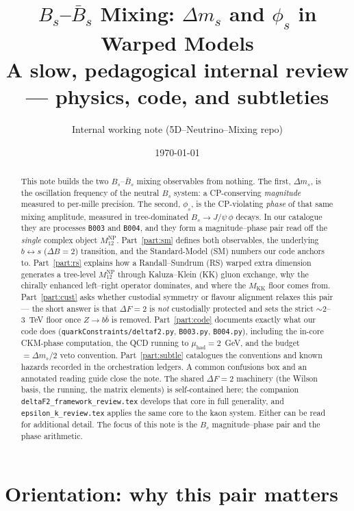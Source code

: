 \documentclass[11pt]{article}
\title{\bf $B_s$--$\bar B_s$ Mixing: $\Delta m_s$ and $\phi_s$ in Warped Models\\[4pt]
\large A slow, pedagogical internal review --- physics, code, and subtleties}
\author{Internal working note (5D--Neutrino--Mixing repo)}
\date{\today}
\newcommand{\MKK}{M_{\mathrm{KK}}}
\newcommand{\code}[1]{\texttt{#1}}
\newcommand{\Bs}{B_s}
\newcommand{\Bsbar}{\bar B_s}
\newcommand{\dms}{\Delta m_s}
\newcommand{\phis}{\phi_s}
\newcommand{\MtwelveNP}{M_{12}^{\mathrm{NP}}}
\newcommand{\muhad}{\mu_{\mathrm{had}}}
\theoremstyle{definition}
\begin{document}
\maketitle

\begin{abstract}
\noindent
This note builds the two $\Bs$--$\Bsbar$ mixing observables from nothing. The
first, $\dms$, is the oscillation frequency of the neutral $\Bs$ system: a
CP-conserving \emph{magnitude} measured to per-mille precision. The second,
$\phis$, is the CP-violating \emph{phase} of that same mixing amplitude,
measured in tree-dominated $\Bs\to J/\psi\,\phi$ decays. In our catalogue they
are processes \code{B003} and \code{B004}, and they form a magnitude--phase pair
read off the \emph{single} complex object $\MtwelveNP$. Part~\ref{part:sm}
defines both observables, the underlying $b\!\leftrightarrow\!s$ ($\Delta B=2$)
transition, and the Standard-Model (SM) numbers our code anchors to.
Part~\ref{part:rs} explains how a Randall--Sundrum (RS) warped extra dimension
generates a tree-level $\MtwelveNP$ through Kaluza--Klein (KK) gluon exchange,
why the chirally enhanced left--right operator dominates, and where the
$\MKK$ floor comes from. Part~\ref{part:cust} asks whether custodial symmetry or
flavour alignment relaxes this pair --- the short answer is that $\Delta F=2$ is
\emph{not} custodially protected and sets the strict $\sim 2$--$3$~TeV floor once
$Z\to b\bar b$ is removed. Part~\ref{part:code} documents exactly what our code
does (\code{quarkConstraints/deltaf2.py}, \code{B003.py}, \code{B004.py}),
including the in-core CKM-phase computation, the QCD running to $\muhad=2$~GeV,
and the budget$=\dms/2$ veto convention. Part~\ref{part:subtle} catalogues the
conventions and known hazards recorded in the orchestration ledgers. A common
confusions box and an annotated reading guide close the note. The shared
$\Delta F=2$ machinery (the Wilson basis, the running, the matrix elements) is
self-contained here; the companion \code{deltaF2\_framework\_review.tex} develops
that core in full generality, and \code{epsilon\_k\_review.tex} applies the same
core to the kaon system. Either can be read for additional detail.
The focus of this note is the $\Bs$ magnitude--phase pair and the phase
arithmetic.
\end{abstract}

\tableofcontents

\part*{Orientation: why this pair matters}
\end{document}
